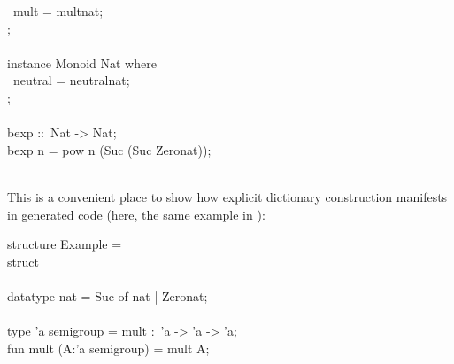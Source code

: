 \begin{isabellebody}
\begin{isamarkuptext}
\hspace*{0pt} ~mult = mult{}nat;\\
\hspace*{0pt}{\char125};\\
\hspace*{0pt}\\
\hspace*{0pt}instance Monoid Nat where {}\\
\hspace*{0pt} ~neutral = neutral{}nat;\\
\hspace*{0pt}{\char125};\\
\hspace*{0pt}\\
\hspace*{0pt}bexp ::~Nat -> Nat;\\
\hspace*{0pt}bexp n = pow n (Suc (Suc Zero{}nat));\\
\hspace*{0pt}\\
\hspace*{0pt}{\char125}%
\end{isamarkuptext}%
\isamarkuptrue%
%
\endisatagquote
{\isafoldquote}%
%
\isadelimquote
%
\endisadelimquote
%
\begin{isamarkuptext}%
\noindent This is a convenient place to show how explicit dictionary construction
  manifests in generated code (here, the same example in ):%
\end{isamarkuptext}%
\isamarkuptrue%
%
\isadelimquote
%
\endisadelimquote
%
\isatagquote
%
\begin{isamarkuptext}%
\isaverbatim%
\noindent%
\hspace*{0pt}structure Example = \\
\hspace*{0pt}struct\\
\hspace*{0pt}\\
\hspace*{0pt}datatype nat = Suc of nat | Zero{}nat;\\
\hspace*{0pt}\\
\hspace*{0pt}type 'a semigroup = {}mult :~'a -> 'a -> 'a{};\\
\hspace*{0pt}fun mult (A{}:'a semigroup) = {}mult A{};\\

\end{isamarkuptext}
\end{isabellebody}
